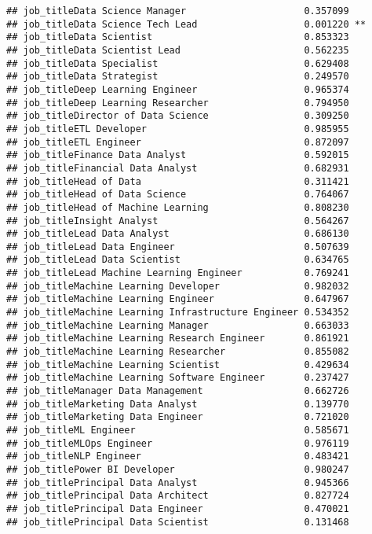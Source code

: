 \documentclass[
]{article}
\begin{document}
\begin{verbatim}
## job_titleData Science Manager                     0.357099    
## job_titleData Science Tech Lead                   0.001220 ** 
## job_titleData Scientist                           0.853323    
## job_titleData Scientist Lead                      0.562235    
## job_titleData Specialist                          0.629408    
## job_titleData Strategist                          0.249570    
## job_titleDeep Learning Engineer                   0.965374    
## job_titleDeep Learning Researcher                 0.794950    
## job_titleDirector of Data Science                 0.309250    
## job_titleETL Developer                            0.985955    
## job_titleETL Engineer                             0.872097    
## job_titleFinance Data Analyst                     0.592015    
## job_titleFinancial Data Analyst                   0.682931    
## job_titleHead of Data                             0.311421    
## job_titleHead of Data Science                     0.764067    
## job_titleHead of Machine Learning                 0.808230    
## job_titleInsight Analyst                          0.564267    
## job_titleLead Data Analyst                        0.686130    
## job_titleLead Data Engineer                       0.507639    
## job_titleLead Data Scientist                      0.634765    
## job_titleLead Machine Learning Engineer           0.769241    
## job_titleMachine Learning Developer               0.982032    
## job_titleMachine Learning Engineer                0.647967    
## job_titleMachine Learning Infrastructure Engineer 0.534352    
## job_titleMachine Learning Manager                 0.663033    
## job_titleMachine Learning Research Engineer       0.861921    
## job_titleMachine Learning Researcher              0.855082    
## job_titleMachine Learning Scientist               0.429634    
## job_titleMachine Learning Software Engineer       0.237427    
## job_titleManager Data Management                  0.662726    
## job_titleMarketing Data Analyst                   0.139770    
## job_titleMarketing Data Engineer                  0.721020    
## job_titleML Engineer                              0.585671    
## job_titleMLOps Engineer                           0.976119    
## job_titleNLP Engineer                             0.483421    
## job_titlePower BI Developer                       0.980247    
## job_titlePrincipal Data Analyst                   0.945366    
## job_titlePrincipal Data Architect                 0.827724    
## job_titlePrincipal Data Engineer                  0.470021    
## job_titlePrincipal Data Scientist                 0.131468    

\end{verbatim}
\end{document}
